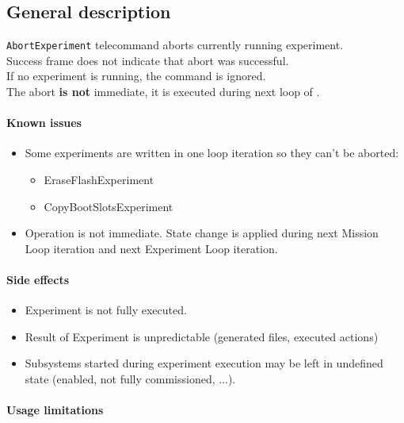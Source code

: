 

\subsection{General description}
\texttt{AbortExperiment} telecommand aborts currently running experiment.\\
Success frame does not indicate that abort was successful.\\
If no experiment is running, the command is ignored.\\
The abort \textbf{is not} immediate, it is executed during next loop of .

\paragraph{Known issues}
\begin{itemize}
	\item Some experiments are written in one loop iteration so they can't be aborted:
		\begin{itemize}
			\item EraseFlashExperiment
			\item CopyBootSlotsExperiment
		\end{itemize}
	\item Operation is not immediate. State change is applied during next Mission Loop iteration and next Experiment Loop iteration.
\end{itemize}

\paragraph{Side effects}
\begin{itemize}
	\item Experiment is not fully executed.
	\item Result of Experiment is unpredictable (generated files, executed actions)
	\item Subsystems started during experiment execution may be left in undefined state (enabled, not fully commissioned, ...).
\end{itemize}

\paragraph{Usage limitations}\mbox{}\\ 
\None

